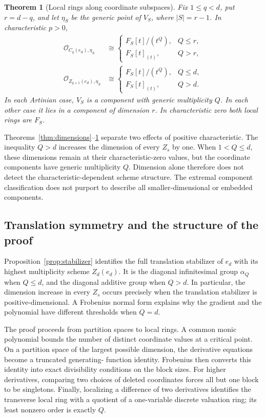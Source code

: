 \documentclass[11pt]{article}
\newtheorem{theorem}{Theorem}[section]
\theoremstyle{remark}
\begin{document}
\begin{theorem}[Local rings along coordinate subspaces]\label{thm:local}
Fix $1\le q<d$, put $r=d-q$, and let $\eta_S$ be the generic point
of $V_S$, where $|S|=r-1$. In characteristic $p>0$,
\begin{align*}
 \mathcal O_{C_q(e_d),\eta_S}&\cong
 \begin{cases}F_S[t]/(t^Q),&Q\le r,\\F_S[t]_{(t)},&Q>r,\end{cases}\\
 \mathcal O_{Z_{q+1}(e_d),\eta_S}&\cong
 \begin{cases}F_S[t]/(t^Q),&Q\le d,\\F_S[t]_{(t)},&Q>d.\end{cases}
\end{align*}
In each Artinian case, $V_S$ is a component with generic multiplicity
$Q$. In each other case it lies in a component of dimension $r$.
In characteristic zero both local rings are $F_S$.
\end{theorem}

Theorems~\ref{thm:dimensions}--\ref{thm:local} separate two effects of
positive characteristic. The inequality $Q>d$ increases the dimension
of every $Z_s$ by one. When $1<Q\le d$, these dimensions remain at
their characteristic-zero values, but the coordinate components have
generic multiplicity $Q$. Dimension alone therefore does not detect
the characteristic-dependent scheme structure. The extremal component
classification does not purport to describe all smaller-dimensional
or embedded components.

\subsection{Translation symmetry and the structure of the proof}

Proposition~\ref{prop:stabilizer} identifies the full translation
stabilizer of $e_d$ with its highest multiplicity scheme $Z_d(e_d)$.
It is the diagonal infinitesimal group $\alpha_Q$ when $Q\le d$,
and the diagonal additive group when $Q>d$. In particular, the
dimension increase in every $Z_s$ occurs precisely when the
translation stabilizer is positive-dimensional. A Frobenius normal
form explains why the gradient and the polynomial have different
thresholds when $Q=d$.

The proof proceeds from partition spaces to local rings. A common
monic polynomial bounds the number of distinct coordinate values
at a critical point. On a partition space of the largest possible
dimension, the derivative equations become a truncated generating-
function identity. Frobenius then converts this identity into exact
divisibility conditions on the block sizes. For higher derivatives,
comparing two choices of deleted coordinates forces all but one
block to be singletons. Finally, localizing a difference of two
derivatives identifies the transverse local ring with a quotient
of a one-variable discrete valuation ring; its least nonzero order
is exactly $Q$.
\end{document}
